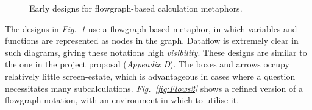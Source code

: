 \documentclass[12pt,twoside,notitlepage,xetex]{report}
\begin{document}
\begin{center}
\begin{figure}[H]
\begin{center}
\end{center}
\caption{Early designs for flowgraph-based calculation metaphors.}
\label{fig:Flows1}
\end{figure}
\end{center}

The designs in \emph{Fig.~\ref{fig:Flows1}} use a flowgraph-based metaphor, in which variables and functions are represented as nodes in the graph.  Dataflow is extremely clear in such diagrams, giving these notations high \emph{visibility}.  These designs are similar to the one in the project proposal (\emph{Appendix D}).  The boxes and arrows occupy relatively little screen-estate, which is advantageous in cases where a question necessitates many subcalculations.  \emph{Fig.~\ref{fig:Flows2}} shows a refined version of a flowgraph notation, with an environment in which to utilise it.
\end{document}
